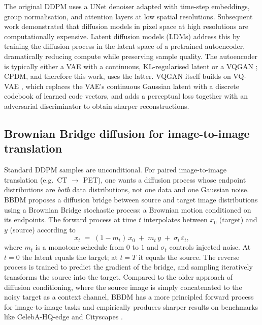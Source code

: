 \documentclass[11pt,a4paper]{article}
\begin{document}
The original DDPM \parencite{ho2020denoising} uses a UNet denoiser 
\parencite{ronneberger2015unet} adapted with time-step embeddings, 
group normalisation, and attention layers at low spatial resolutions. 
Subsequent work demonstrated that diffusion models in pixel space at 
high resolutions are computationally expensive. Latent diffusion models (LDMs) 
\parencite{rombach2022ldm} address this by training the diffusion process in the 
latent space of a pretrained autoencoder, dramatically reducing compute while 
preserving sample quality. The autoencoder is typically either a VAE 
\parencite{kingma2014vae} with a continuous, KL-regularised latent or 
a VQGAN \parencite{esser2021vqgan}; CPDM, and therefore this 
work, uses the latter. VQGAN itself builds on VQ-VAE \parencite{oord2017vqvae}, 
which replaces the VAE's continuous Gaussian latent with a discrete codebook of 
learned code vectors, and adds a perceptual loss together with an adversarial 
discriminator to obtain sharper reconstructions.

\subsection{Brownian Bridge diffusion for image-to-image translation}
\label{sec:bbdm}

Standard DDPM samples are unconditional. For paired image-to-image translation (e.g.\ CT $\to$ PET), 
one wants a diffusion process whose endpoint distributions are \emph{both} data 
distributions, not one data and one Gaussian noise. BBDM \parencite{li2023bbdm} 
proposes a diffusion bridge between source and target image distributions using a 
Brownian Bridge stochastic process: a Brownian motion conditioned on its endpoints. 
The forward process at time $t$ interpolates between $x_0$ (target) and $y$ (source) 
according to
\begin{equation}
x_t \;=\; (1 - m_t)\, x_0 \;+\; m_t\, y \;+\; \sigma_t\, \varepsilon_t,
\label{eq:bbdm-fwd}
\end{equation}
where $m_t$ is a monotone schedule from $0$ to $1$ and $\sigma_t$ controls 
injected noise. At $t = 0$ the latent equals the target; at $t = T$ it equals 
the source. The reverse process is trained to predict the gradient of the bridge, 
and sampling iteratively transforms the source into the target. Compared to 
the older approach of diffusion conditioning, where the source image
is simply concatenated to the noisy target as a context channel, BBDM has a 
more principled 
forward process for image-to-image tasks and empirically produces sharper 
results on benchmarks like CelebA-HQ-edge and Cityscapes \parencite{li2023bbdm}.
\end{document}
